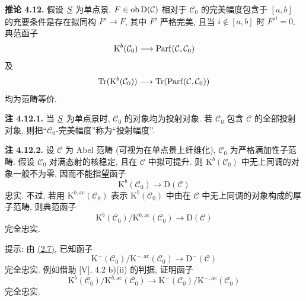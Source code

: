 \textbf{推论 4.12.} 假设 \(\underline S\) 为单点景. \(F\in\Ob\Dpx(\mathcal C)\) 相对于 \(\mathcal C_0\) 的完美幅度包含于 \([a,b]\) 的充要条件是存在拟同构 \(F'\to F\), 其中 \(F'\) 严格完美, 且当 \(i\notin[a,b]\) 时 \(F'^i=0\). 典范函子
\[
  \Kpx^b(\mathcal C_0)\longrightarrow\Parf(\mathcal C,\mathcal C_0)
\]
及
\[
  \Tr(\Kpx^b(\mathcal C_0))\longrightarrow\Tr(\Parf(\mathcal C,\mathcal C_0))
\]
均为范畴等价.

\textbf{注 4.12.1.} 当 \(\underline S\) 为单点景时, \(\mathcal C_0\) 的对象均为投射对象. 若 \(\mathcal C_0\) 包含 \(\mathcal C\) 的全部投射对象, 则把“\(\mathcal C_0\)-完美幅度”称为“投射幅度”.



\providecommand{\Cpx}{\mathrm C}
\providecommand{\Kpx}{\mathrm K}
\providecommand{\Dpx}{\mathrm D}
\providecommand{\Ho}{\mathrm H}
\providecommand{\RHom}{\mathrm R\!\operatorname{Hom}}
\providecommand{\Ob}{\operatorname{ob}}
\providecommand{\qis}{\xrightarrow{\sim}}
\providecommand{\RHom}{\mathrm R\!\Hom}
\providecommand{\Ext}{\operatorname{Ext}}
\providecommand{\Hom}{\operatorname{Hom}}
\providecommand{\Tr}{\operatorname{Tr}}

\providecommand{\Add}{\operatorname{Add}}
\providecommand{\Cart}{\operatorname{Cart}}
\providecommand{\perfamp}{\operatorname{perf.amp}}
\providecommand{\perfdim}{\operatorname{perf.dim}}
\providecommand{\toramp}{\operatorname{tor.amp}}
\providecommand{\torf}{\operatorname{torf}}
\providecommand{\injf}{\operatorname{injf}}
\providecommand{\rg}{\operatorname{rg}}
\providecommand{\is}{\mathrm{is}}
\providecommand{\Mod}{\operatorname{Mod}}



\textbf{注 4.12.2.} 设 \(\mathcal C\) 为 Abel 范畴 (可视为在单点景上纤维化), \(\mathcal C_0\) 为严格满加性子范畴. 假设 \(\mathcal C_0\) 对满态射的核稳定, 且在 \(\mathcal C\) 中拟可提升. 则 \(\Kpx^b(\mathcal C_0)\) 中无上同调的对象一般不为零, 因而不能指望函子
\[
  \Kpx^b(\mathcal C_0)\longrightarrow \Dpx(\mathcal C)
\]
忠实. 不过, 若用 \(\Kpx^{b,\mathrm{ac}}(\mathcal C_0)\) 表示 \(\Kpx^b(\mathcal C_0)\) 中由在 \(\mathcal C\) 中无上同调的对象构成的厚子范畴, 则典范函子
\[
  \Kpx^b(\mathcal C_0)/\Kpx^{b,\mathrm{ac}}(\mathcal C_0)
  \longrightarrow \Dpx(\mathcal C)
\]
完全忠实.

提示: 由 \hyperlink{sga6.e01.prop.2-7}{(2.7)}, 已知函子
\[
  \Kpx^-(\mathcal C_0)/\Kpx^{-,\mathrm{ac}}(\mathcal C_0)
  \longrightarrow \Dpx^-(\mathcal C)
\]
完全忠实. 例如借助 [V], 4.2 b)(ii) 的判据, 证明函子
\[
  \Kpx^b(\mathcal C_0)/\Kpx^{b,\mathrm{ac}}(\mathcal C_0)
  \longrightarrow
  \Kpx^-(\mathcal C_0)/\Kpx^{-,\mathrm{ac}}(\mathcal C_0)
\]
完全忠实.

